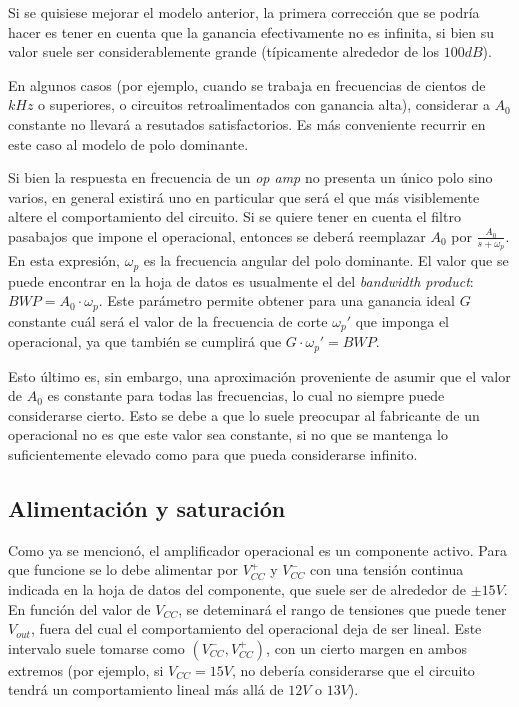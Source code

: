 \documentclass[main.tex]{subfiles}
\begin{document}
Si se quisiese mejorar el modelo anterior, la primera correcci\'on que se podr\'ia hacer es tener en cuenta que la ganancia efectivamente no es infinita, si bien su valor suele ser considerablemente grande (t\'ipicamente alrededor de los $100dB$). \par

En algunos casos (por ejemplo, cuando se trabaja en frecuencias de cientos de $kHz$ o superiores, o circuitos retroalimentados con ganancia alta), considerar a $A_0$ constante no llevar\'a a resutados satisfactorios. Es m\'as conveniente recurrir en este caso al modelo de polo dominante.\par

Si bien la respuesta en frecuencia de un \textit{op amp} no presenta un \'unico polo sino varios, en general existir\'a uno en particular que ser\'a el que m\'as visiblemente altere el comportamiento del circuito. Si se quiere tener en cuenta el filtro pasabajos que impone el operacional, entonces se deber\'a reemplazar $A_0$ por $\frac{A_0}{s+\omega_p}$. En esta expresi\'on, $\omega_p$ es la frecuencia angular del polo dominante. El valor que se puede encontrar en la hoja de datos es usualmente el del \textit{bandwidth product}: $BWP=A_0 \cdot \omega_p$. Este par\'ametro permite obtener para una ganancia ideal $G$ constante cu\'al ser\'a el valor de la frecuencia de corte $\omega_p'$ que imponga el operacional, ya que tambi\'en se cumplir\'a que $G \cdot \omega_p' = BWP$.\par

 Esto \'ultimo es, sin embargo, una aproximaci\'on proveniente de asumir que el valor de $A_0$ es constante para todas las frecuencias, lo cual no siempre puede considerarse cierto. Esto se debe a que lo suele preocupar al fabricante de un operacional no es que este valor sea constante, si no que se mantenga lo suficientemente elevado como para que pueda considerarse infinito. \par



\subsection{Alimentaci\'on y saturaci\'on}
Como ya se mencion\'o, el amplificador operacional es un componente activo. Para que funcione se lo debe alimentar por $V_{CC} ^+$ y $V_{CC} ^-$ con una tensi\'on continua indicada en la hoja de datos del componente, que suele ser de alrededor de $\pm 15V$. En funci\'on del valor de $V_{CC}$, se deteminar\'a el rango de tensiones que puede tener $V_{out}$, fuera del cual el comportamiento del operacional deja de ser lineal. Este intervalo suele tomarse como $(V_{CC} ^-, V_{CC} ^+)$, con un cierto margen en ambos extremos (por ejemplo, si $V_{CC}=15V$, no deber\'ia considerarse que el circuito tendr\'a un comportamiento lineal m\'as all\'a de $12V$ o $13V$).
\end{document}
